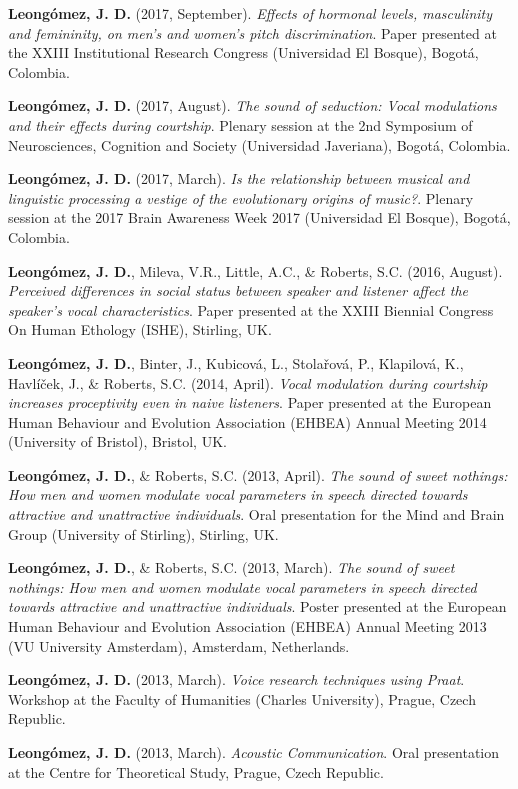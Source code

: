 \documentclass[11pt,a4paper,]{awesome-cv}
\begin{document}
\textbf{Leongómez, J. D.} (2017, September). \emph{Effects of hormonal
levels, masculinity and femininity, on men's and women's pitch
discrimination}. Paper presented at the XXIII Institutional Research
Congress (Universidad El Bosque), Bogotá, Colombia.

\textbf{Leongómez, J. D.} (2017, August). \emph{The sound of seduction:
Vocal modulations and their effects during courtship}. Plenary session
at the 2nd Symposium of Neurosciences, Cognition and Society
(Universidad Javeriana), Bogotá, Colombia.

\textbf{Leongómez, J. D.} (2017, March). \emph{Is the relationship
between musical and linguistic processing a vestige of the evolutionary
origins of music?}. Plenary session at the 2017 Brain Awareness Week
2017 (Universidad El Bosque), Bogotá, Colombia.

\textbf{Leongómez, J. D.}, Mileva, V.R., Little, A.C., \& Roberts, S.C.
(2016, August). \emph{Perceived differences in social status between
speaker and listener affect the speaker's vocal characteristics}. Paper
presented at the XXIII Biennial Congress On Human Ethology (ISHE),
Stirling, UK.

\textbf{Leongómez, J. D.}, Binter, J., Kubicová, L., Stolařová, P.,
Klapilová, K., Havlíček, J., \& Roberts, S.C. (2014, April). \emph{Vocal
modulation during courtship increases proceptivity even in naive
listeners}. Paper presented at the European Human Behaviour and
Evolution Association (EHBEA) Annual Meeting 2014 (University of
Bristol), Bristol, UK.

\textbf{Leongómez, J. D.}, \& Roberts, S.C. (2013, April). \emph{The
sound of sweet nothings: How men and women modulate vocal parameters in
speech directed towards attractive and unattractive individuals}. Oral
presentation for the Mind and Brain Group (University of Stirling),
Stirling, UK.

\textbf{Leongómez, J. D.}, \& Roberts, S.C. (2013, March). \emph{The
sound of sweet nothings: How men and women modulate vocal parameters in
speech directed towards attractive and unattractive individuals}. Poster
presented at the European Human Behaviour and Evolution Association
(EHBEA) Annual Meeting 2013 (VU University Amsterdam), Amsterdam,
Netherlands.

\textbf{Leongómez, J. D.} (2013, March). \emph{Voice research techniques
using Praat}. Workshop at the Faculty of Humanities (Charles
University), Prague, Czech Republic.

\textbf{Leongómez, J. D.} (2013, March). \emph{Acoustic Communication}.
Oral presentation at the Centre for Theoretical Study, Prague, Czech
Republic.
\end{document}
